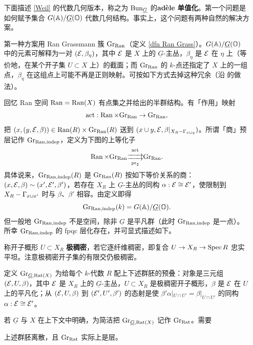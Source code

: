 下面描述 \eqref{Weil} 的代数几何版本，称之为 $\Bun_{\underline G}$ 的\textbf{adèle 单值化}。第一个问题是如何赋予集合 $G(\bA)/\underline G(\bO)$ 代数几何结构。事实上，这个问题有两种自然的解决方案。

第一种方案用 Ran Grassmann 簇 $\Gr_{\Ran}$（定义 \ref{dfn Ran Grass}）。$G(\bA)/\underline G(\bO)$ 中的元素可解释为一对 $(\mE,\beta_\eta)$，其中 $\mE$ 是 $X$ 上的 $\underline G$-主丛，$\beta_\eta$ 是 $\mE$ 在 $\eta$ 上（等价地，在某个开子集 $U\subset X$ 上）的截面；而 $\Gr_{\Ran}$ 的 $k$-点还指定了 $X$ 上的一组点，$\beta_\eta$ 在这组点上可能不再是正则映射。可按如下方式去掉这种冗余（沿 \cite[\S~2]{Ga3} 的做法）。

回忆 Ran 空间 $\Ran=\Ran(X)$ 有点集之并给出的半群结构。有「作用」映射
\[\on{act}: \Ran\times \Gr_{\Ran}\to \Gr_{\Ran},\]
把 $(x, (y,\mE,\beta))\in \Ran(R)\times\Gr_{\Ran}(R)$ 送到 $(x\cup y, \mE, \beta|_{X_R-\Ga_{x\cup y}})$。所谓「商」预层记作 $\Gr_{\Ran,\on{indep}}$，定义为下图的上等化子
\[\Ran\times\Gr_{\Ran}\substack{\on{act}\\  \xrightarrow{\hspace*{.6cm}} \\[-0.6ex]  \xrightarrow{\hspace*{.6cm}} \\ \pr_2 } \Gr_{\Ran}.\]
具体说来，$\Gr_{\Ran,\on{indep}}(R)$ 是 $\Gr_{\Ran}(R)$ 按如下等价关系的商：$(x,\mE,\beta)\sim (x',\mE',\beta')$，若存在 $X_R$ 上 $\underline G$-主丛的同构 $\al: \mE\cong \mE'$，使限制到 $X_R-\Ga_{x\cup x'}$ 时与 $\beta$、$\beta'$ 相容。由定义即得
\[\Gr_{\Ran,\on{indep}}(k)= G(\bA)/\underline G(\bO).\]
但一般地 $\Gr_{\Ran,\on{indep}}$ 不是空间，除非 $\underline G$ 是平凡群（此时 $\Gr_{\Ran,\on{indep}}$ 是一点）。所幸 $\Gr_{\Ran,\on{indep}}$ 的 fpqc 层化存在，并可显式描述如下。

称开子概形 $U\subset X_R$ \textbf{极稠密}，若它逐纤维稠密，即复合 $U\to X_R\to \Spec R$ 忠实平坦。注意极稠密开子集的有限交仍极稠密。

定义 $\Gr_{\underline G,\Rat(X)}$ 为给每个 $k$-代数 $R$ 配上下述群胚的预叠：对象是三元组 $(\mE,U,\beta)$，其中 $\mE$ 是 $X_R$ 上的 $\underline G$-主丛，$U\subset X_R$ 是极稠密开子概形，$\beta$ 是 $\mE$ 在 $U$ 上的平凡化；从 $(\mE,U,\beta)$ 到 $(\mE',U',\beta')$ 的态射是使 $\beta'\alpha|_{U\cap U'}=\beta|_{U\cap U'}$ 的同构 $\alpha:\mE\cong \mE'$。

若 $\underline G$ 与 $X$ 在上下文中明确，为简洁把 $\Gr_{\underline G,\Rat(X)}$ 记作 $\Gr_{\Rat}$。需要

\begin{lem}\label{rat sheaf}
上述群胚离散，且 $\Gr_{\Rat}$ 实际上是层。
\end{lem}

